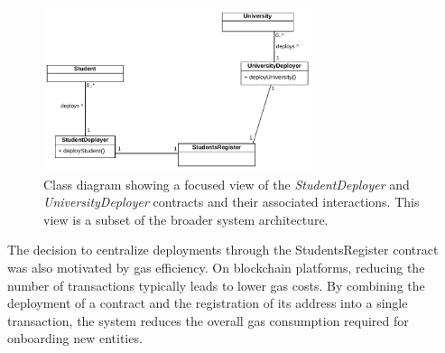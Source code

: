 \begin{figure}
  \centering
  \includegraphics[width=0.7\textwidth]{figures/Deployers class diagram.pdf}
  \caption[Class diagram focused on \textit{StudentDeployer} and \textit{UniversityDeployer} contracts]{Class diagram showing a focused view of the \textit{StudentDeployer} and \textit{UniversityDeployer} contracts and their associated interactions. This view is a subset of the broader system architecture.}
  \label{fig:deployersContractClass}
\end{figure}

The decision to centralize deployments through the StudentsRegister contract was also motivated by gas efficiency. On blockchain platforms, reducing the number of transactions typically leads to lower gas costs. By combining the deployment of a contract and the registration of its address into a single transaction, the system reduces the overall gas consumption required for onboarding new entities.

